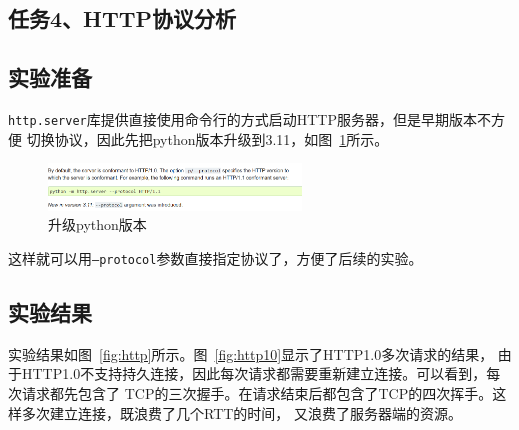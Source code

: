 \documentclass[a4paper,twoside]{article}
\begin{document}
\begin{spacing}{1.2}
\section{任务4、HTTP协议分析}

\subsection{实验准备}

\texttt{http.server}库提供直接使用命令行的方式启动HTTP服务器，但是早期版本不方便
切换协议，因此先把python版本升级到3.11，如图~\ref{fig:py11}所示。
\begin{figure}[htb]
	\centering
	\caption{升级python版本}
	\label{fig:py11}
	\includegraphics[width=0.6\textwidth]{py11.png}
\end{figure}

这样就可以用\texttt{--protocol}参数直接指定协议了，方便了后续的实验。

\subsection{实验结果}

实验结果如图~\ref{fig:http}所示。图~\ref{fig:http10}显示了HTTP1.0多次请求的结果，
由于HTTP1.0不支持持久连接，因此每次请求都需要重新建立连接。可以看到，每次请求都先包含了
TCP的三次握手。在请求结束后都包含了TCP的四次挥手。这样多次建立连接，既浪费了几个RTT的时间，
又浪费了服务器端的资源。


\end{spacing}
\end{document}
